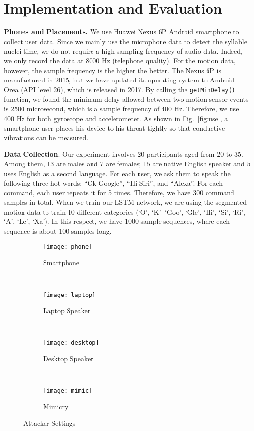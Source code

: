 \section{Implementation and Evaluation}
\textbf{Phones and Placements.} We use Huawei Nexus 6P Android smartphone to collect user data. Since we mainly use the microphone data to detect the syllable nuclei time, we do not require a high sampling frequency of audio data. Indeed, we only record the data at 8000 Hz (telephone quality). For the motion data, however, the sample frequency is the higher the better. The Nexus 6P is manufactured in 2015, but we have updated its operating system to Android Orea (API level 26), which is released in 2017. By calling the \texttt{getMinDelay()} function, we found the minimum delay allowed between two motion sensor events is 2500 microsecond, which is a sample frequency of 400 Hz. Therefore, we use 400 Hz for both gyroscope and accelerometer. As shown in Fig.~\ref{fig:use}, a smartphone user places his device to his throat tightly so that conductive vibrations can be measured. 

\textbf{Data Collection}. Our experiment involves 20 participants aged from 20 to 35. Among them, 13 are males and 7 are females; 15 are native English speaker and 5 uses English as a second language. For each user, we ask them to speak the following three hot-words: ``Ok Google'', ``Hi Siri'', and ``Alexa''. For each command, each user repeats it for 5 times. Therefore, we have 300 command samples in total. When we train our LSTM network, we are using the segmented motion data to train 10 different categories (`O', `K', `Goo', `Gle', `Hi', `Si', `Ri', `A', `Le', `Xa'). In this respect, we have 1000 sample sequences, where each sequence is about 100 samples long.


\begin{figure}[!h]
	\centering
	\begin{subfigure}[t]{0.45\textwidth}
		\centering
		\texttt{[image: phone]}
		\caption{Smartphone}
	\end{subfigure}%
	~ 
	\begin{subfigure}[t]{0.45\textwidth}
		\centering
		\texttt{[image: laptop]}
		\caption{Laptop Speaker}
	\end{subfigure}
~ 
\begin{subfigure}[t]{0.45\textwidth}
	\centering
	\texttt{[image: desktop]}
	\caption{Desktop Speaker}
\end{subfigure}
	~
	\begin{subfigure}[t]{0.45\textwidth}
	\centering
	\texttt{[image: mimic]}
	\caption{Mimicry }
\end{subfigure}
	\caption{Attacker Settings}
	\label{fig:attacks}
\end{figure}


